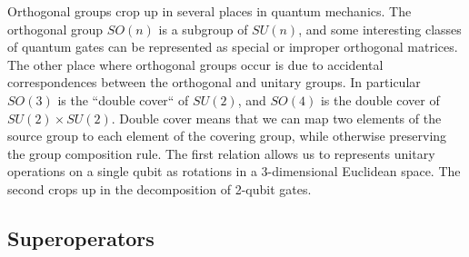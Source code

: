 Orthogonal groups crop up in several places in quantum mechanics. The orthogonal group $SO(n)$ is a subgroup of $SU(n)$, and some interesting classes of quantum gates can be represented as special or improper orthogonal matrices. The other place where orthogonal groups occur is due to accidental correspondences between the orthogonal and unitary groups. In particular $SO(3)$ is the ``double cover`` of $SU(2)$, and $SO(4)$ is the double cover of $SU(2)\times SU(2)$. Double cover means that we can map two elements of the source group to each element of the covering group, while otherwise preserving the group composition rule.  The first relation allows us to represents unitary operations on a single qubit as rotations in a 3-dimensional Euclidean space. The second crops up in the decomposition of 2-qubit gates. 






\subsection{Superoperators}



